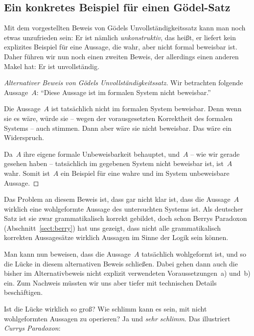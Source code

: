 \documentclass[twoside]{../zirkelblatt1415}
\theoremstyle{definition}
\theoremstyle{plain}
\theoremstyle{remark}
\begin{document}
\subsection{Ein konkretes Beispiel für einen Gödel-Satz}

Mit dem vorgestellten Beweis von Gödels Unvollständigkeitssatz kann man noch
etwas unzufrieden sein: Er ist nämlich \emph{unkonstruktiv}, das heißt, er
liefert kein explizites Beispiel für eine Aussage, die wahr, aber nicht formal
beweisbar ist. Daher führen wir nun noch einen zweiten Beweis, der allerdings
einen anderen Makel hat: Er ist unvollständig.

\begin{proof}[Alternativer Beweis von Gödels Unvollständigkeitssatz]
Wir betrachten folgende Aussage~$A$: "`Diese Aussage ist im formalen System nicht
beweisbar."'

Die Aussage~$A$ ist tatsächlich nicht im formalen System beweisbar. Denn wenn
sie es wäre, würde sie -- wegen der vorausgesetzten Korrektheit des formalen
Systems -- auch stimmen. Dann aber wäre sie nicht beweisbar. Das wäre ein
Widerspruch.

Da~$A$ ihre eigene formale Unbeweisbarkeit behauptet, und~$A$ -- wie wir gerade
gesehen haben -- tatsächlich im gegebenen System nicht beweisbar ist, ist~$A$
wahr. Somit ist~$A$ ein Beispiel für eine wahre und im System unbeweisbare
Aussage.
\end{proof}

Das Problem an diesem Beweis ist, dass gar nicht klar ist, dass die Aussage~$A$
wirklich eine wohlgeformte Aussage des untersuchten Systems ist. Als deutscher
Satz ist sie zwar grammatikalisch korrekt gebildet, doch schon Berrys Paradoxon
(Abschnitt~\ref{sect:berry}) hat uns gezeigt, dass nicht alle grammatikalisch
korrekten Aussagesätze wirklich Aussagen im Sinne der Logik sein können.

Man kann nun beweisen, dass die Aussage~$A$ tatsächlich wohlgeformt ist, und so
die Lücke in diesem alternativen Beweis schließen. Dabei gehen dann auch die
bisher im Alternativbeweis nicht explizit verwendeten Voraussetzungen~a) und~b) ein. Zum
Nachweis müssten wir uns aber tiefer mit technischen Details beschäftigen.

Ist die Lücke wirklich so groß? Wie schlimm kann es sein, mit nicht
wohlgeformten Aussagen zu operieren? Ja und \emph{sehr schlimm}. Das
illustriert \emph{Currys Paradoxon}:
\end{document}
